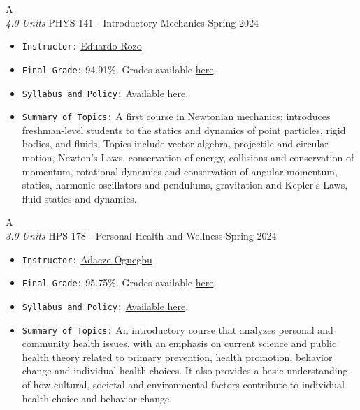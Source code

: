 \cventry
{A \\ \small{\textit{4.0 Units}}}
{PHYS 141 - Introductory Mechanics}
{Spring 2024}
{}
{}
{
  \begin{itemize}
    \item \texttt{Instructor:} \href{https://w3.physics.arizona.edu/people/eduardo-rozo}{Eduardo Rozo}
    \item \texttt{Final Grade:} 94.91\%. Grades available \href{https://mhrezaei.com/assets/cv/courses/Spring2024/PHYS141/Grades.pdf}{here}.
    \item \texttt{Syllabus and Policy:} \href{https://mhrezaei.com/assets/cv/courses/Spring2024/PHYS141/Syllabus.pdf}{Available here}.
    \item \texttt{Summary of Topics:} A first course in Newtonian mechanics; introduces freshman-level students to the statics and dynamics of point particles, rigid bodies, and fluids. Topics include vector algebra, projectile and circular motion, Newton's Laws, conservation of energy, collisions and conservation of momentum, rotational dynamics and conservation of angular momentum, statics, harmonic oscillators and pendulums, gravitation and Kepler's Laws, fluid statics and dynamics.
  \end{itemize}
}


\cventry
{A \\ \small{\textit{3.0 Units}}}
{HPS 178 - Personal Health and Wellness}
{Spring 2024}
{}
{}
{
  \begin{itemize}
    \item \texttt{Instructor:} \href{}{Adaeze Oguegbu}
    \item \texttt{Final Grade:} 95.75\%. Grades available \href{https://mhrezaei.com/assets/cv/courses/Spring2024/HPS178/Grades.pdf}{here}.
    \item \texttt{Syllabus and Policy:} \href{https://mhrezaei.com/assets/cv/courses/Spring2024/HPS178/Syllabus.pdf}{Available here}.
    \item \texttt{Summary of Topics:} An introductory course that analyzes personal and community health issues,
    with an emphasis on current science and public health theory related to primary prevention, health
    promotion, behavior change and individual health choices. It also provides a basic understanding of
    how cultural, societal and environmental factors contribute to individual health choice and behavior
    change.
  \end{itemize}
}



